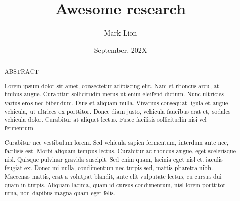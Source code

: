 \documentclass[12pt,british,VeneziaPhdThesis]{PhdThesis}[2004/02/17]%
\author{Mark Lion}
\title{Awesome research}
\date{September, 202X}
\begin{document}
\renewcommand{\chapterautorefname}{Chapter}
\renewcommand{\sectionautorefname}{Section}
\renewcommand{\subsectionautorefname}{Section}



 

\pagestyle{empty}
\maketitle
\begin{abstract}

ABSTRACT 

Lorem ipsum dolor sit amet, consectetur adipiscing elit. Nam et rhoncus arcu, at finibus augue. Curabitur sollicitudin metus ut enim eleifend dictum. Nunc ultricies varius eros nec bibendum. Duis et aliquam nulla. Vivamus consequat ligula et augue vehicula, ut ultrices ex porttitor. Donec diam justo, vehicula faucibus erat et, sodales vehicula dolor. Curabitur at aliquet lectus. Fusce facilisis sollicitudin nisi vel fermentum.

Curabitur nec vestibulum lorem. Sed vehicula sapien fermentum, interdum ante nec, facilisis est. Morbi aliquam tempus lectus. Curabitur ac rhoncus augue, eget scelerisque nisl. Quisque pulvinar gravida suscipit. Sed enim quam, lacinia eget nisl et, iaculis feugiat ex. Donec mi nulla, condimentum nec turpis sed, mattis pharetra nibh. Maecenas mattis, erat a volutpat blandit, ante elit vulputate lectus, eu cursus dui quam in turpis. Aliquam lacinia, quam id cursus condimentum, nisl lorem porttitor urna, non dapibus magna quam eget felis.
 
\end{abstract}
\label{abstract}

%

\frontmatter
{}
\pagestyle{serif}
\tableofcontents
\listoffigures
\end{document}
